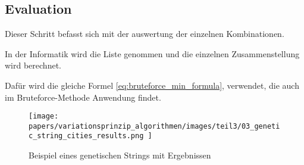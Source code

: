 %
%
%
%
\subsection{Evaluation
\label{genetic_algorithm:evaluation}}
Dieser Schritt befasst sich mit der auswertung der einzelnen 
Kombinationen.

In der Informatik wird die Liste genommen und die einzelnen 
Zusammenstellung wird berechnet.

Dafür wird die gleiche Formel \ref{eq:bruteforce_min_formula}, 
verwendet, die auch im Bruteforce-Methode Anwendung findet.

\begin{figure} [h]
	\centering
	\texttt{[image: 
        papers/variationsprinzip\_algorithmen/images/teil3/03\_genetic\_string\_cities\_results.png
        ]}
	\caption{Beispiel eines genetischen Strings mit Ergebnissen}
	\label{fig:cities_genetic_string_results}
\end{figure}

